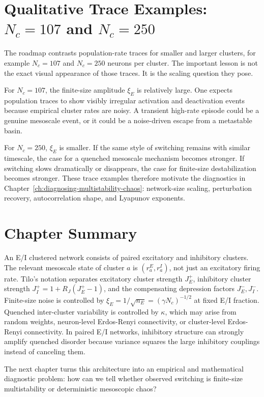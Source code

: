 \section[Qualitative Trace Examples: Nc=107 and Nc=250]{Qualitative Trace Examples: \(N_c=107\) and \(N_c=250\)}
\label{sec:ch08-trace-examples}

The roadmap contrasts population-rate traces for smaller and larger clusters,
for example \(N_c=107\) and \(N_c=250\) neurons per cluster. The important
lesson is not the exact visual appearance of those traces. It is the scaling
question they pose.

For \(N_c=107\), the finite-size amplitude \(\xi_E\) is relatively large. One
expects population traces to show visibly irregular activation and deactivation
events because empirical cluster rates are noisy. A transient high-rate episode
could be a genuine mesoscale event, or it could be a noise-driven escape from a
metastable basin.

For \(N_c=250\), \(\xi_E\) is smaller. If the same style of switching remains with
similar timescale, the case for a quenched mesoscale mechanism becomes
stronger. If switching slows dramatically or disappears, the case for
finite-size destabilization becomes stronger. These trace examples therefore
motivate the diagnostics in Chapter~\ref{ch:diagnosing-multistability-chaos}:
network-size scaling, perturbation recovery, autocorrelation shape, and
Lyapunov exponents.

\section{Chapter Summary}
\label{sec:ch08-summary}

An E/I clustered network consists of paired excitatory and inhibitory clusters.
The relevant mesoscale state of cluster \(a\) is
\((r_a^E,r_a^I)\), not just an excitatory firing rate. Tilo's notation
separates excitatory cluster strength \(J_E^+\), inhibitory cluster strength
\(J_I^+=1+R_J(J_E^+-1)\), and the compensating depression factors
\(J_E^-,J_I^-\). Finite-size noise is controlled by
\(\xi_E=1/\sqrt{n_E}=(\gamma N_c)^{-1/2}\) at fixed E/I fraction. Quenched
inter-cluster variability is controlled by \(\kappa\), which may arise from
random weights, neuron-level Erdos-Renyi connectivity, or cluster-level
Erdos-Renyi connectivity. In paired E/I networks, inhibitory structure can
strongly amplify quenched disorder because variance squares the large
inhibitory couplings instead of canceling them.

The next chapter turns this architecture into an empirical and mathematical
diagnostic problem: how can we tell whether observed switching is finite-size
multistability or deterministic mesoscopic chaos?
